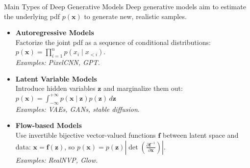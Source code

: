 \documentclass{beamer}
\begin{document}
\begin{frame}{Main Types of Deep Generative Models}
Deep generative models aim to estimate the underlying pdf \(
p(\mathbf{x}) \) to generate new, realistic samples.

\vspace{0.3cm}
\begin{itemize}
  \item \textbf{Autoregressive Models} \\
  Factorize the joint pdf as a sequence of conditional distributions:  
  \( p(\mathbf{x}) = \prod_{i=1}^n p(x_i \mid x_{<i}) \). \\
  \textit{Examples: PixelCNN, GPT.}
  
  \vspace{0.3cm}
  \item \alert{\textbf{Latent Variable Models}} \\
  Introduce hidden variables \( \mathbf{z} \) and marginalize them out:  
  \( p(\mathbf{x}) = \int_{-\infty}^{+\infty} p(\mathbf{x} \mid \mathbf{z}) p(\mathbf{z}) \, d\mathbf{z} \) \\
  \textit{Examples: VAEs, GANs, stable diffusion}.

  \vspace{0.3cm}
  \item \textbf{Flow-based Models} \\
  Use invertible bijective vector-valued functions \( \mathbf{f} \) between latent space and data: \(\mathbf{x} =  \mathbf{f}(\mathbf{z}) \), so   
  \( p(\mathbf{x}) = p(\mathbf{z}) \left| \det \left(\frac{\partial \mathbf{f}^{-1}}{\partial \mathbf{x}}\right) \right| \). \\
  \textit{Examples: RealNVP, Glow.}
\end{itemize}
\end{frame}
\end{document}
